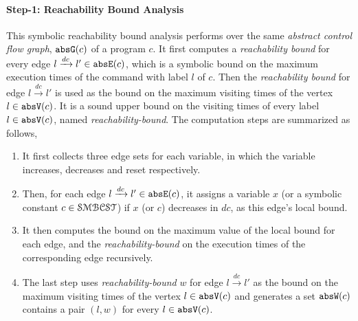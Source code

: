\paragraph{Step-1: Reachability Bound Analysis}
This symbolic reachability bound analysis performs over the same \emph{abstract control flow graph}, $\mathtt{abs}{\mathtt{G}}(c)$ of a program $c$. 
It first computes a \emph{reachability bound} for every edge $l \xrightarrow{dc} l' \in \mathtt{abs}{\mathtt{E}}(c)$,
which is a symbolic bound on the maximum execution times of the command with label $l$ of $c$.
Then the \emph{reachability bound} for edge $l \xrightarrow{dc} l'$ is used as the bound on the maximum visiting times of the vertex $l \in \mathtt{abs}{\mathtt{V}}(c)$.
It is a sound upper bound on the visiting times
of every label $l \in \mathtt{abs}{\mathtt{V}}(c)$, named \emph{reachability-bound}.
The computation steps are 
summarized as follows,
\begin{enumerate}
  \item It first collects three edge sets for each variable,
in which the variable increases, decreases and reset respectively.
\item
Then, for each edge  $l \xrightarrow{dc} l' \in \mathtt{abs}{\mathtt{E}}(c)$, it assigns a variable $x$ (or a symbolic constant $c \in \mathcal{SMBCST}$) if $x$ (or $c$) decreases in $dc$, as this edge's local bound.
\item
It then computes the bound on the maximum value of the local bound for each edge,
and the \emph{reachability-bound} on the execution
times of the corresponding edge recursively.
\item The last step uses \emph{reachability-bound} $w$ for edge $l \xrightarrow{dc} l'$ as the bound on the maximum visiting times of the vertex $l \in \mathtt{abs}{\mathtt{V}}(c)$ and generates a set $\mathtt{abs}{\mathtt{W}}(c)$ contains a pair $(l, w)$ for every $l \in \mathtt{abs}{\mathtt{V}}(c)$.
\end{enumerate}

